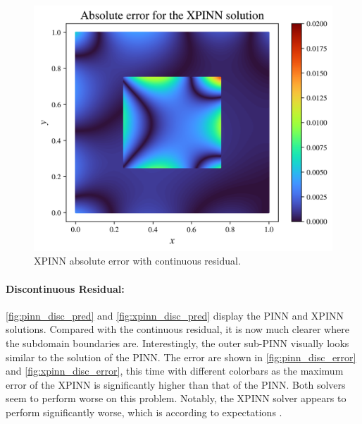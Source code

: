 \begin{figure}[h]
    \centering
    \includegraphics[width=\linewidth]{Project1XPINNs/figures/Poisson/smooth_xpinn_Poisson_error.png}
    \caption{XPINN absolute error with continuous residual.}
    \label{fig:xpinn_smooth_error}
\end{figure}


\paragraph{Discontinuous Residual:}
\autoref{fig:pinn_disc_pred} and \autoref{fig:xpinn_disc_pred} display the PINN and XPINN solutions.
Compared with the continuous residual, it is now much clearer where the subdomain boundaries are.
Interestingly, the outer sub-PINN visually looks similar to the solution of the PINN.
The error are shown in \autoref{fig:pinn_disc_error} and \autoref{fig:xpinn_disc_error}, this time with different colorbars as the maximum error of the XPINN is significantly higher than that of the PINN.
Both solvers seem to perform worse on this problem. Notably, the XPINN solver appears to perform significantly worse, which is according to expectations \cite{XPINN_generalize}.

